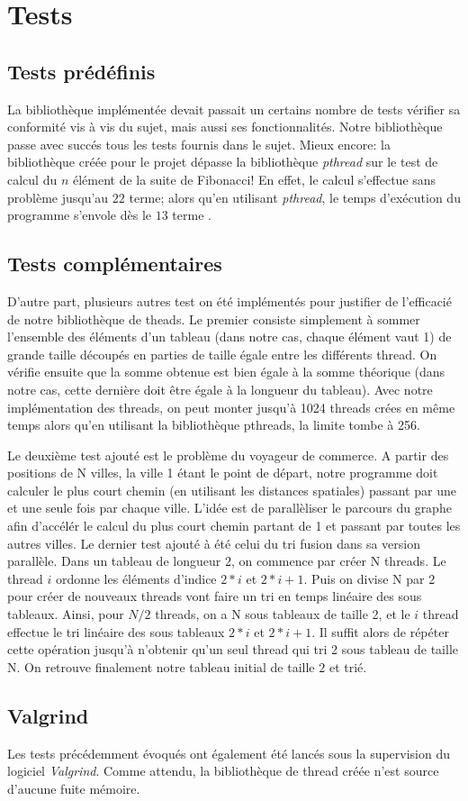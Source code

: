 \section{Tests}

\subsection{Tests prédéfinis}


La bibliothèque implémentée devait passait un certains nombre de tests vérifier sa conformité vis à vis du sujet, mais aussi ses fonctionnalités. Notre bibliothèque passe avec succés tous les tests fournis dans le sujet.
Mieux encore: la bibliothèque créée pour le projet dépasse la bibliothèque \textit{pthread} sur le test de calcul du $n$ élément de la suite de Fibonacci! En effet, le calcul s'effectue sans problème jusqu'au $22$ terme; alors qu'en utilisant \textit{pthread}, le temps d'exécution du programme s'envole dès le $13$ terme .


\subsection{Tests complémentaires}
D'autre part, plusieurs autres test on été implémentés pour justifier de l'efficacié de notre bibliothèque de theads. Le premier consiste simplement à sommer l'ensemble des éléments d'un tableau (dans notre cas, chaque élément vaut 1) de grande taille découpés en parties de taille égale entre les différents thread. On vérifie ensuite que la somme obtenue est bien égale à la somme théorique (dans notre cas, cette dernière doit être égale à la longueur du tableau). Avec notre implémentation des threads, on peut monter jusqu’à 1024 threads crées en même temps alors qu’en utilisant la bibliothèque pthreads, la limite tombe à 256.

Le deuxième test ajouté est le problème du voyageur de commerce. A partir des positions de N villes, la ville 1 étant le point de départ, notre programme doit calculer le plus court chemin (en utilisant les distances spatiales) passant par une et une seule fois par chaque ville. L'idée est de parallèliser le parcours du graphe afin d'accélér le calcul du plus court chemin partant de 1 et passant par toutes les autres villes.
Le dernier test ajouté à été celui du tri fusion dans sa version parallèle. Dans un tableau de longueur $2$, on commence par créer N threads. Le thread $i$ ordonne les éléments d'indice $2*i$ et $2*i +1$. Puis on divise N par 2 pour créer de nouveaux threads vont faire un tri en temps linéaire des sous tableaux. Ainsi, pour $N/2$ threads, on a N sous tableaux de taille 2, et le $i$ thread effectue le tri linéaire des sous tableaux $2*i$ et $2*i+1$. Il suffit alors de répéter cette opération jusqu'à n'obtenir qu'un seul thread qui tri 2 sous tableau de taille N. On retrouve finalement notre tableau initial de taille $2$ et trié.


\subsection{Valgrind}
Les tests précédemment évoqués ont également été lancés sous la supervision du logiciel \textit{Valgrind}. Comme attendu, la bibliothèque de thread créée n'est source d'aucune fuite mémoire.
